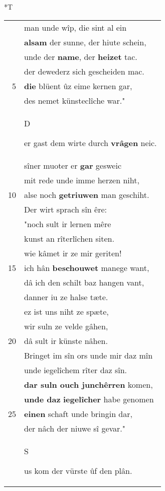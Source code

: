 \documentclass[8pt,a4paper,notitlepage]{article}
\begin{document}
\begin{table}[ht]
\begin{minipage}[t]{0.5\linewidth}
\end{minipage}
\hspace{0.5cm}
\begin{minipage}[t]{0.5\linewidth}
\small
\begin{center}*T
\end{center}
\begin{tabular}{rl}
 & man unde wîp, die sint al ein\\ 
 & \textbf{alsam} der sunne, der hiute schein,\\ 
 & unde der \textbf{name}, der \textbf{heizet} tac.\\ 
 & der dewederz sich gescheiden mac.\\ 
5 & \textbf{die} blüent ûz eime kernen gar,\\ 
 & des nemet künsteclîche war."\\ 
 & \begin{large}D\end{large}er gast dem wirte durch \textbf{vrâgen} neic.\\ 
 & sîner muoter er \textbf{gar} gesweic\\ 
 & mit rede unde imme herzen niht,\\ 
10 & alse noch \textbf{getriuwen} man geschiht.\\ 
 & Der wirt sprach sîn êre:\\ 
 & "noch sult ir lernen mêre\\ 
 & kunst an rîterlîchen siten.\\ 
 & wie kâmet ir ze mir geriten!\\ 
15 & ich hân \textbf{beschouwet} manege want,\\ 
 & dâ ich den schilt baz hangen vant,\\ 
 & danner iu ze halse tæte.\\ 
 & ez ist uns niht ze spæte,\\ 
 & wir suln ze velde gâhen,\\ 
20 & dâ sult ir künste nâhen.\\ 
 & Bringet im sîn ors unde mir daz mîn\\ 
 & unde iegelîchem rîter daz sîn.\\ 
 & \textbf{dar suln ouch junchêrren} komen,\\ 
 & \textbf{unde daz} \textbf{iegelîcher} habe genomen\\ 
25 & \textbf{einen} schaft unde bringin dar,\\ 
 & der nâch der niuwe sî gevar."\\ 
 & \begin{large}S\end{large}us kom der vürste ûf den plân.\\ 

\end{tabular}
\end{minipage}
\end{table}
\end{document}
